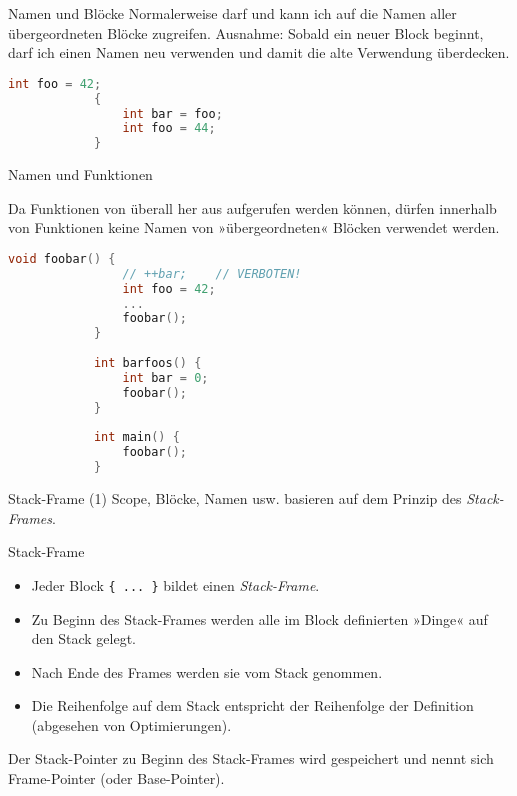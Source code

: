\begin{frame}[fragile]{Namen und Blöcke}
	Normalerweise darf und kann ich auf die Namen aller übergeordneten Blöcke zugreifen.
	{\scriptsize Ausnahme: Sobald ein neuer Block beginnt, darf ich einen Namen neu verwenden und damit die alte Verwendung überdecken.}
	
	\begin{block}{}
		\begin{lstlisting}[language=C++]
			int foo = 42;
			{
			    int bar = foo;
			    int foo = 44;
			}
		\end{lstlisting}
	\end{block}
\end{frame}

\begin{frame}[fragile]{Namen und Funktionen}
	\footnotesize
	
	Da Funktionen von überall her aus aufgerufen werden können, dürfen innerhalb von Funktionen keine Namen von »übergeordneten« Blöcken verwendet werden.
	
	\scriptsize
	\begin{block}{}
		\begin{lstlisting}[language=C++]
			void foobar() {
			    // ++bar;    // VERBOTEN!
			    int foo = 42;
			    ...
			    foobar();
			}
			
			int barfoos() {
			    int bar = 0;
			    foobar();
			}
			
			int main() {
			    foobar();
			}
		\end{lstlisting}
	\end{block}
\end{frame}

\begin{frame}[fragile]{Stack-Frame (1)}
	Scope, Blöcke, Namen usw. basieren auf dem Prinzip des \emph{Stack-Frames}.
	
	\pause
	
	\begin{block}{Stack-Frame}
		\begin{itemize}
			\item Jeder Block \verb|{ ... }| bildet einen \emph{Stack-Frame}.
			\item Zu Beginn des Stack-Frames werden alle im Block definierten »Dinge« auf den Stack gelegt.
			\item Nach Ende des Frames werden sie vom Stack genommen.
			\item Die Reihenfolge auf dem Stack entspricht der Reihenfolge der Definition {\tiny(abgesehen von Optimierungen)}.
		\end{itemize}
	\end{block}
	
	\pause
	
	Der Stack-Pointer zu Beginn des Stack-Frames wird gespeichert und nennt sich Frame-Pointer (oder Base-Pointer).
\end{frame}

